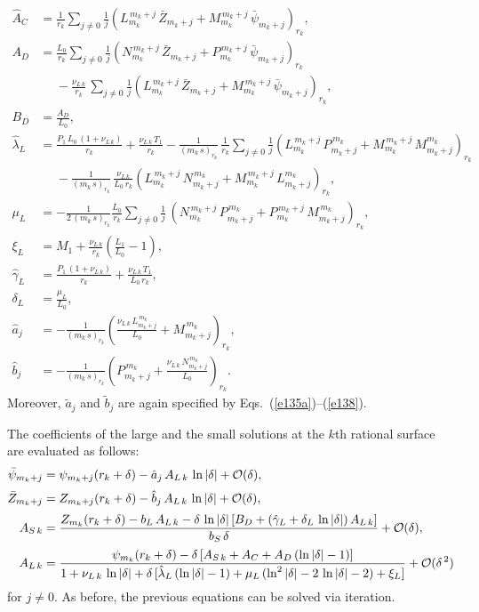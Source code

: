 \documentclass[12pt,prb,aps]{revtex4-1}
\begin{document}
\begin{align}
\hat{A}_{C} &= \frac{1}{r_k}\sum_{j\neq 0}\frac{1}{j}\left(L_{m_k}^{\,m_k+j}\,\bar{Z}_{m_k+j}+ M_{m_k}^{\,m_k+j}\,\bar{\psi}_{m_k+j}\right)_{r_k},\\[0.5ex]
A_{D} &=  \frac{L_0}{r_k}\sum_{j\neq 0}\frac{1}{j}\left(N_{m_k}^{\,m_k+j}\,\bar{Z}_{m_k+j}+ P_{m_k}^{\,m_k+j}\,\bar{\psi}_{m_k+j}\right)_{r_k}
\nonumber\\[0.5ex]&\phantom{=}-
\frac{\nu_{L\,k}}{r_k}\,\sum_{j\neq 0}\frac{1}{j}\left(L_{m_k}^{\,m_k+j}\,\bar{Z}_{m_k+j}+ M_{m_k}^{\,m_k+j}\,\bar{\psi}_{m_k+j}\right)_{r_k},
\\[0.5ex]
B_{D} &= \frac{A_{D}}{L_0},\\[0.5ex]
\hat{\lambda}_{L} &= \frac{P_1\,L_0\,(1+\nu_{L\,k}) }{r_k} + \frac{\nu_{L\,k}\,T_1}{r_k}
-\frac{1}{(m_k\,s)_{r_k}}\,\frac{1}{r_k}\sum_{j\neq 0}\frac{1}{j}\left(L_{m_k}^{\,m_k+j}\,P_{m_k+j}^{\,m_k}+M_{m_k}^{\,m_k+j}\,M_{m_k+j}^{m_k}\right)_{r_k}\nonumber\\[0.5ex]&\phantom{=}
- \frac{1}{(m_k\,s)_{r_k}}\,\frac{\nu_{L\,k}}{L_0\,r_k}
\left(L_{m_k}^{\,m_k+j}\,N_{m_k+j}^{\,m_k}+M_{m_k}^{\,m_k+j}\,L_{m_k+j}^{m_k}\right)_{r_k},\\[0.5ex]
\mu_{L}&= -\frac{1}{2\,(m_k\,s)_{r_k}}\frac{L_0}{r_k}\sum_{j\neq 0}\frac{1}{j}\,(N_{m_k}^{\,m_k+j}\,P_{m_k+j}^{\,m_k}+P_{m_k}^{\,m_k+j}\,M_{m_k+j}^{\,m_k})_{r_k},\\[0.5ex]
\xi_{L} &= M_1+ \frac{\nu_{L\,k}}{r_k} \left(\frac{L_1}{L_0}-1\right),\\[0.5ex]
\hat{\gamma}_{L} &=\frac{P_1\,(1+\nu_{L\,k})}{r_k} + \frac{\nu_{L\,k}\,T_1}{L_0\,r_k},\\[0.5ex]
\delta_{L} &= \frac{\mu_{L}}{L_0},\\[0.5ex]
\hat{a}_j&=-\frac{1}{(m_k\,s)_{r_k}}\left(\frac{\nu_{L\,k}\,L^{\,m_k}_{m_k+j}}{L_0}+M^{\,m_k}_{m_k+j}\right)_{r_k},\\[0.5ex]
\hat{b}_j&=- \frac{1}{(m_k\,s)_{r_k}}\left(P^{\,m_k}_{m_k+j}+\frac{\nu_{L\,k}\,N^{\,m_k}_{m_k+j}}{L_0}\right)_{r_k}.
\end{align}
Moreover, $\tilde{a}_j$ and $\tilde{b}_j$ are again specified by Eqs.~(\ref{e135a})--(\ref{e138}). 

The coefficients of the large and the small solutions at the $k$th rational surface are evaluated as follows:
\begin{align}
\bar{\psi}_{m_k+j} &= \psi_{m_k+j}(r_k+\delta)- \hat{a}_j\,A_{L\,k}\,\ln|\delta| +{\cal O}(\delta),\\[0.5ex]
\bar{Z}_{m_k+j}&= Z_{m_k+j}(r_k+\delta)-\hat{b}_j\,A_{L\,k}\,\ln|\delta|+{\cal O}(\delta),\\[0.5ex]
A_{S\,k} &= \frac{Z_{m_k}(r_k+\delta)-b_{L}\,A_{L\,k}-\delta\,\ln|\delta|\,[B_D+(\hat{\gamma}_L+\delta_L\,\ln|\delta|)\,A_{L\,k}]}
{b_S\,\delta}+{\cal O}(\delta),\\[0.5ex]
A_{L\,k} &= \frac{\psi_{m_k}(r_k+\delta)-\delta\,[A_{S\,k}+A_C+A_D\,(\ln|\delta|-1)]}
{1+\nu_{L\,k}\,\ln|\delta|+\delta\,[\hat{\lambda}_L\,(\ln|\delta|-1)+ \mu_L\,(\ln^2|\delta|-2\,\ln|\delta|-2)+\xi_L]}+{\cal O}(\delta^{\,2})
\end{align}
for $j\neq 0$. As before, the previous equations can be solved via iteration.
\end{document}
